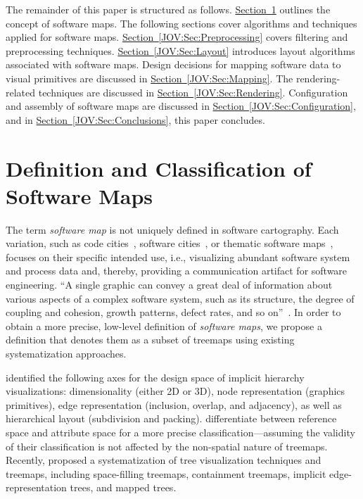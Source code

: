 \documentclass{svjour3}                     %
\begin{document}
The remainder of this paper is structured as follows.
\hyperref[JOV:Sec:DesignSpace]{Section~\ref*{JOV:Sec:DesignSpace}} outlines the concept of software maps.
The following sections cover algorithms and techniques applied for software maps.
\hyperref[JOV:Sec:Preprocessing]{Section~\ref*{JOV:Sec:Preprocessing}} covers filtering and preprocessing techniques.
\hyperref[JOV:Sec:Layout]{Section~\ref*{JOV:Sec:Layout}} introduces layout algorithms associated with software maps.
Design decisions for mapping software data to visual primitives are discussed in \hyperref[JOV:Sec:Mapping]{Section~\ref*{JOV:Sec:Mapping}}.
The rendering-related techniques are discussed in \hyperref[JOV:Sec:Rendering]{Section~\ref*{JOV:Sec:Rendering}}.
Configuration and assembly of software maps are discussed in \hyperref[JOV:Sec:Configuration]{Section~\ref*{JOV:Sec:Configuration}}, and in \hyperref[JOV:Sec:Conclusions]{Section~\ref*{JOV:Sec:Conclusions}}, this paper concludes.

\section{Definition and Classification of Software Maps}
\label{JOV:Sec:DesignSpace}
The term \emph{software map} is not uniquely defined in software cartography. 
Each variation, such as code cities~\citep{wettel2008-large}, software cities~\citep{steinbruckner2013-evolution}, or thematic software maps~\citep{kuhn2008-thematicmaps}, focuses on their specific intended use, i.e., visualizing abundant software system and process data and, thereby, providing a communication artifact for software engineering.
\enquote{A single graphic can convey a great deal of information about various aspects of a complex software system, such as its structure, the degree of coupling and cohesion, growth patterns, defect rates, and so on}~\citep{kuhn2008-thematicmaps}.
In order to obtain a more precise, low-level definition of \emph{software maps}, we propose a definition that denotes them as a subset of treemaps using existing systematization approaches.

\cite{schulz2011-implicit} identified the following axes for the design space of implicit hierarchy visualizations: dimensionality (either 2D or 3D), node representation (graphics primitives), edge representation (inclusion, overlap, and adjacency), as well as hierarchical layout (subdivision and packing).
\cite{duebel2014-2d3drepresentation} differentiate between reference space and attribute space for a more precise classification---assuming the validity of their classification is not affected by the non-spatial nature of treemaps.
Recently, \cite{scheibel2020-treemaptaxonomy} proposed a systematization of tree visualization techniques and treemaps, including space-filling treemaps, containment treemaps, implicit edge-representation trees, and mapped trees.
\end{document}
